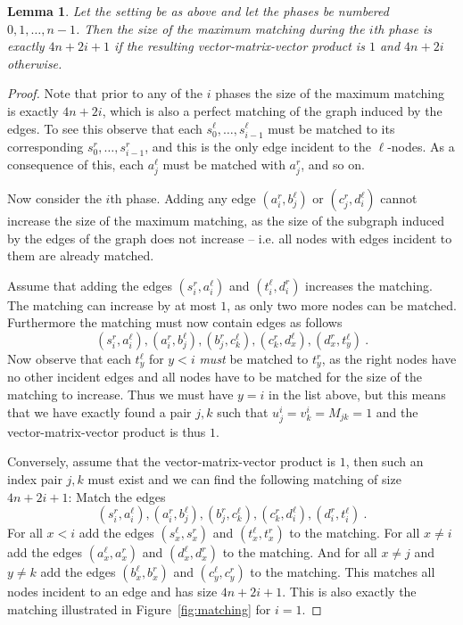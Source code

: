 \documentclass[a4paper,11pt]{article}
\newtheorem{lemma}{Lemma}
\theoremstyle{definition}
\begin{document}
\begin{lemma}\label{lem:max_match}
    Let the setting be as above and let the phases be numbered $0, 1, \ldots,
    n-1$. Then the size of the maximum matching during the $i$th phase is exactly
    $4n + 2i + 1$ if the resulting vector-matrix-vector product is $1$ and
    $4n+2i$ otherwise.
\end{lemma}
\begin{proof}
    Note that prior to any of the $i$ phases the size of the maximum matching
    is exactly $4n + 2i$, which is also a perfect matching of the graph induced
    by the edges. To see this observe that each $s^\ell_0, \ldots,
    s^\ell_{i-1}$ must be matched to its corresponding
    $s^r_0,\ldots,s^r_{i-1}$, and this is the only edge incident to the
    $\ell$-nodes. As a consequence of this, each $a^\ell_j$ must be matched
    with $a^r_j$, and so on.

    Now consider the $i$th phase. Adding any edge $(a^r_i, b^\ell_j)$ or
    $(c^r_j,d^\ell_i)$ cannot increase the size of the maximum matching, as the
    size of the subgraph induced by the edges of the graph does not increase --
    i.e. all nodes with edges incident to them are already matched.

    Assume that adding the edges $(s^r_i,a^\ell_i)$ and $(t^\ell_i,d^r_i)$
    increases the matching. The matching can increase by at most $1$, as only
    two more nodes can be matched. Furthermore the matching must now contain
    edges as follows
    \[
        (s^r_i,a^\ell_i), (a^r_i,b^\ell_j), (b^r_j, c^\ell_k), (c^r_k,
        d^\ell_x), (d^r_x, t^\ell_y)\ .
    \]
    Now observe that each $t^\ell_y$ for $y < i$ \emph{must} be matched to
    $t^r_y$, as the right nodes have no other incident edges and all nodes have
    to be matched for the size of the matching to increase. Thus we must have
    $y=i$ in the list above, but this means that we have exactly found a pair
    $j,k$ such that $u^i_j = v^i_k = M_{jk} = 1$ and the vector-matrix-vector
    product is thus $1$.

    Conversely, assume that the vector-matrix-vector product is $1$, then such
    an index pair $j,k$ must exist and we can find the following matching of
    size $4n+2i+1$: Match the edges
    \[
        (s^r_i,a^\ell_i), (a^r_i,b^\ell_j), (b^r_j, c^\ell_k), (c^r_k,
        d^\ell_i), (d^r_i, t^\ell_i)\ .
    \]
    For all $x < i$ add the edges $(s^\ell_x,s^r_x)$ and $(t^\ell_x,t^r_x)$ to
    the matching. For all $x\ne i$ add the edges $(a^\ell_x,a^r_x)$ and
    $(d^\ell_x,d^r_x)$ to the matching. And for all $x\ne j$ and $y\ne k$ add
    the edges $(b^\ell_x,b^r_x)$ and $(c^\ell_y,c^r_y)$ to the matching. This
    matches all nodes incident to an edge and has size $4n+2i+1$. This is also
    exactly the matching illustrated in Figure~\ref{fig:matching} for $i=1$.
\end{proof}
\end{document}
